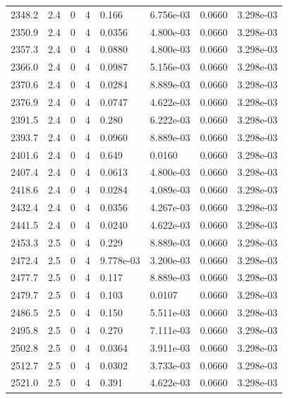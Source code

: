 \documentclass[preview]{standalone}
\begin{document}
{{{{{{{{{{{{\begin{tabular}{L{1.2cm}C{1.2cm} C{0.3cm}C{0.5cm} C{1.4cm}C{1.4cm} C{1.4cm}C{1.4cm}}
  2348.2  &   2.4  & 0     &  4 &  0.166  & 6.756e-03  & 0.0660 &  3.298e-03   \\ 
  2350.9  &   2.4  & 0     &  4 &  0.0356  & 4.800e-03  & 0.0660 &  3.298e-03   \\ 
  2357.3  &   2.4  & 0     &  4 &  0.0880  & 4.800e-03  & 0.0660 &  3.298e-03   \\ 
  2366.0  &   2.4  & 0     &  4 &  0.0987  & 5.156e-03  & 0.0660 &  3.298e-03   \\ 
  2370.6  &   2.4  & 0     &  4 &  0.0284  & 8.889e-03  & 0.0660 &  3.298e-03   \\ 
  2376.9  &   2.4  & 0     &  4 &  0.0747  & 4.622e-03  & 0.0660 &  3.298e-03   \\ 
  2391.5  &   2.4  & 0     &  4 &  0.280  & 6.222e-03  & 0.0660 &  3.298e-03   \\ 
  2393.7  &   2.4  & 0     &  4 &  0.0960  & 8.889e-03  & 0.0660 &  3.298e-03   \\ 
  2401.6  &   2.4  & 0     &  4 &  0.649  & 0.0160  & 0.0660 &  3.298e-03   \\ 
  2407.4  &   2.4  & 0     &  4 &  0.0613  & 4.800e-03  & 0.0660 &  3.298e-03   \\ 
  2418.6  &   2.4  & 0     &  4 &  0.0284  & 4.089e-03  & 0.0660 &  3.298e-03   \\ 
  2432.4  &   2.4  & 0     &  4 &  0.0356  & 4.267e-03  & 0.0660 &  3.298e-03   \\ 
  2441.5  &   2.4  & 0     &  4 &  0.0240  & 4.622e-03  & 0.0660 &  3.298e-03   \\ 
  2453.3  &   2.5  & 0     &  4 &  0.229  & 8.889e-03  & 0.0660 &  3.298e-03   \\ 
  2472.4  &   2.5  & 0     &  4 &  9.778e-03  & 3.200e-03  & 0.0660 &  3.298e-03   \\ 
  2477.7  &   2.5  & 0     &  4 &  0.117  & 8.889e-03  & 0.0660 &  3.298e-03   \\ 
  2479.7  &   2.5  & 0     &  4 &  0.103  & 0.0107  & 0.0660 &  3.298e-03   \\ 
  2486.5  &   2.5  & 0     &  4 &  0.150  & 5.511e-03  & 0.0660 &  3.298e-03   \\ 
  2495.8  &   2.5  & 0     &  4 &  0.270  & 7.111e-03  & 0.0660 &  3.298e-03   \\ 
  2502.8  &   2.5  & 0     &  4 &  0.0364  & 3.911e-03  & 0.0660 &  3.298e-03   \\ 
  2512.7  &   2.5  & 0     &  4 &  0.0302  & 3.733e-03  & 0.0660 &  3.298e-03   \\ 
  2521.0  &   2.5  & 0     &  4 &  0.391  & 4.622e-03  & 0.0660 &  3.298e-03   \\ 

\end{tabular}}}}}}}}}}}}}
\end{document}
